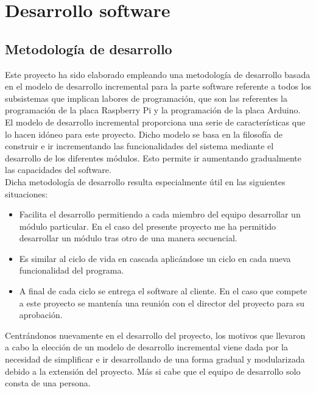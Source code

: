 \newpage

\chapter{Desarrollo software }
\label{chap:desarrollo-software}

\section{Metodología de desarrollo}

Este proyecto ha sido elaborado empleando una metodología de desarrollo basada en el modelo de desarrollo incremental para la parte software referente a todos los subsistemas que
implican labores de programación, que son las referentes la programación de la placa Raspberry Pi y la programación de la placa Arduino.\\

El modelo de desarrollo incremental proporciona una serie de características que lo hacen idóneo para este proyecto. Dicho modelo se basa en la filosofía de construir 
e ir incrementando las funcionalidades del sistema mediante el desarrollo de los diferentes módulos. Esto permite ir aumentando gradualmente las capacidades del software. \\

Dicha metodología de desarrollo resulta especialmente útil en las siguientes situaciones:\\

\begin{itemize}
 \item Facilita el desarrollo permitiendo a cada miembro del equipo desarrollar un módulo particular. En el caso del presente proyecto me ha permitido desarrollar un módulo tras otro de una manera secuencial.
 \item Es similar al ciclo de vida en cascada aplicándose un ciclo en cada nueva funcionalidad del programa.
 \item A final de cada ciclo se entrega el software al cliente. En el caso que compete a este proyecto se mantenía una reunión con el director del proyecto para su aprobación.
\end{itemize}

Centrándonos nuevamente en el desarrollo del proyecto, los motivos que llevaron a cabo la elección de un modelo de desarrollo incremental viene dada por la necesidad de simplificar e ir
desarrollando de una forma gradual y modularizada debido a la extensión del proyecto. Más si cabe que el equipo de desarrollo solo consta de una persona.\\

